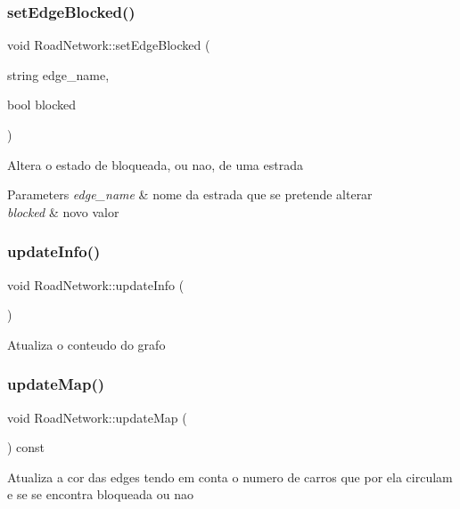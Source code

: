 \subsubsection{\texorpdfstring{set\+Edge\+Blocked()}{setEdgeBlocked()}}
{\footnotesize\ttfamily void Road\+Network\+::set\+Edge\+Blocked (\begin{DoxyParamCaption}\item[{string}]{edge\+\_\+name,  }\item[{bool}]{blocked }\end{DoxyParamCaption})}

Altera o estado de bloqueada, ou nao, de uma estrada 
\begin{DoxyParams}{Parameters}
{\em edge\+\_\+name} & nome da estrada que se pretende alterar \\
\hline
{\em blocked} & novo valor \\
\hline
\end{DoxyParams}
\mbox{\label{class_road_network_ad0d2c77f25ade353665e8ca11e1775fa}} 
\subsubsection{\texorpdfstring{update\+Info()}{updateInfo()}}
{\footnotesize\ttfamily void Road\+Network\+::update\+Info (\begin{DoxyParamCaption}{ }\end{DoxyParamCaption})}

Atualiza o conteudo do grafo \mbox{\label{class_road_network_a7b186cdb92006a41431f89df8b55c9ec}} 
\subsubsection{\texorpdfstring{update\+Map()}{updateMap()}}
{\footnotesize\ttfamily void Road\+Network\+::update\+Map (\begin{DoxyParamCaption}{ }\end{DoxyParamCaption}) const}

Atualiza a cor das edges tendo em conta o numero de carros que por ela circulam e se se encontra bloqueada ou nao \mbox{\label{class_road_network_ac84b2b00026bff9f86b176eeea850c85}} 
